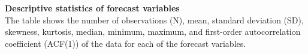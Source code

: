 \documentclass[11pt,letterpaper]{scrartcl}
\begin{document}

\begin{table}[h!]
    \centering
    \footnotesize{
    
    }
    \caption{
    \textbf{Descriptive statistics of forecast variables}
    \vspace{5pt}\\
    \footnotesize{The table shows the number of observations (N), mean, standard deviation (SD), skewness, kurtosis, median, minimum, maximum, and first-order autocorrelation coefficient (ACF(1)) of the data for each of the forecast variables.}}
    \label{tab:descriptive_stats}
\end{table}
\clearpage

\end{document}
